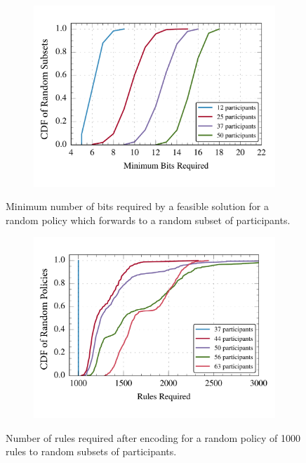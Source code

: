 \begin{figure}[t!] 
\begin{minipage}{1\linewidth}
\begin{subfigure}[b]{0.96\linewidth}
\includegraphics[width=\linewidth]{figures/bit_counts}
\end{subfigure} 
\end{minipage} 
\caption{Minimum number of bits required by a feasible solution for a random policy which forwards to a random subset of participants.}
\label{fig:bits}
\end{figure}


\begin{figure}[t!] 
\begin{minipage}{1\linewidth}
\begin{subfigure}[b]{0.96\linewidth}
\includegraphics[width=\linewidth]{figures/rule_cdf}
\end{subfigure} 
\end{minipage} 
\caption{Number of rules required after encoding for a random policy of 1000 rules to random subsets of participants.}
\label{fig:rules}
\end{figure}

